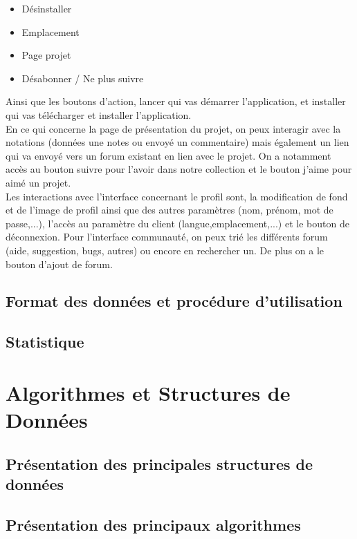 \documentclass{report}
\begin{document}
\begin{itemize}
    \item Désinstaller
    \item Emplacement
    \item Page projet
    \item Désabonner / Ne plus suivre
\end{itemize}
Ainsi que les boutons d'action, lancer qui vas démarrer l'application, et installer qui vas télécharger et installer l'application.\\
En ce qui concerne la page de présentation du projet, on peux interagir avec la notations (données une notes ou envoyé un commentaire) mais également un lien qui va envoyé vers un forum existant en lien avec le projet. On a notamment accès au bouton suivre pour l'avoir dans notre collection et le bouton j'aime pour aimé un projet.\\
Les interactions avec l'interface concernant le profil sont, la modification de fond et de l'image de profil ainsi que des autres paramètres (nom, prénom, mot de passe,...), l'accès au paramètre du client (langue,emplacement,...) et le bouton de déconnexion. Pour l'interface communauté, on peux trié les différents forum (aide, suggestion, bugs, autres) ou encore en rechercher un. De plus on a le bouton d'ajout de forum.


\section{Format des données et procédure d'utilisation} %
\section{Statistique} %

\chapter{Algorithmes et Structures de Données}
\section{Présentation des principales structures de données}
\section{Présentation des principaux algorithmes}%
\end{document}
